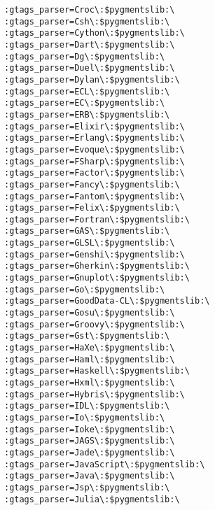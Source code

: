 \documentclass[11pt]{article}
\begin{document}
\begin{lstlisting}
                         :gtags_parser=Croc\:$pygmentslib:\
                         :gtags_parser=Csh\:$pygmentslib:\
                         :gtags_parser=Cython\:$pygmentslib:\
                         :gtags_parser=Dart\:$pygmentslib:\
                         :gtags_parser=Dg\:$pygmentslib:\
                         :gtags_parser=Duel\:$pygmentslib:\
                         :gtags_parser=Dylan\:$pygmentslib:\
                         :gtags_parser=ECL\:$pygmentslib:\
                         :gtags_parser=EC\:$pygmentslib:\
                         :gtags_parser=ERB\:$pygmentslib:\
                         :gtags_parser=Elixir\:$pygmentslib:\
                         :gtags_parser=Erlang\:$pygmentslib:\
                         :gtags_parser=Evoque\:$pygmentslib:\
                         :gtags_parser=FSharp\:$pygmentslib:\
                         :gtags_parser=Factor\:$pygmentslib:\
                         :gtags_parser=Fancy\:$pygmentslib:\
                         :gtags_parser=Fantom\:$pygmentslib:\
                         :gtags_parser=Felix\:$pygmentslib:\
                         :gtags_parser=Fortran\:$pygmentslib:\
                         :gtags_parser=GAS\:$pygmentslib:\
                         :gtags_parser=GLSL\:$pygmentslib:\
                         :gtags_parser=Genshi\:$pygmentslib:\
                         :gtags_parser=Gherkin\:$pygmentslib:\
                         :gtags_parser=Gnuplot\:$pygmentslib:\
                         :gtags_parser=Go\:$pygmentslib:\
                         :gtags_parser=GoodData-CL\:$pygmentslib:\
                         :gtags_parser=Gosu\:$pygmentslib:\
                         :gtags_parser=Groovy\:$pygmentslib:\
                         :gtags_parser=Gst\:$pygmentslib:\
                         :gtags_parser=HaXe\:$pygmentslib:\
                         :gtags_parser=Haml\:$pygmentslib:\
                         :gtags_parser=Haskell\:$pygmentslib:\
                         :gtags_parser=Hxml\:$pygmentslib:\
                         :gtags_parser=Hybris\:$pygmentslib:\
                         :gtags_parser=IDL\:$pygmentslib:\
                         :gtags_parser=Io\:$pygmentslib:\
                         :gtags_parser=Ioke\:$pygmentslib:\
                         :gtags_parser=JAGS\:$pygmentslib:\
                         :gtags_parser=Jade\:$pygmentslib:\
                         :gtags_parser=JavaScript\:$pygmentslib:\
                         :gtags_parser=Java\:$pygmentslib:\
                         :gtags_parser=Jsp\:$pygmentslib:\
                         :gtags_parser=Julia\:$pygmentslib:\

\end{lstlisting}
\end{document}
